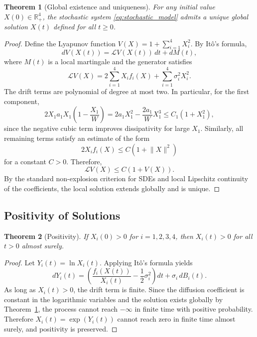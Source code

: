 \documentclass[11pt]{article}
\numberwithin{equation}{section}
\newtheorem{theorem}{Theorem}[section]
\begin{document}
\begin{theorem}[Global existence and uniqueness]\label{thm:G-exist_unique}
For any initial value $X(0)\in\mathbb{R}_+^4$, the stochastic system \eqref{eq:stochastic_model} admits a unique global solution $X(t)$ defined for all $t\ge 0$.
\end{theorem}

\begin{proof}
Define the Lyapunov function $V(X)=1+\sum_{i=1}^4X_i^2$. By It\^o's formula,
\begin{equation}\label{eq:Ito_V}
dV(X(t))=\mathcal{L}V(X(t))\,dt+dM(t),
\end{equation}
where $M(t)$ is a local martingale and the generator satisfies
\begin{equation}\label{eq:gen_V}
\mathcal{L}V(X)=2\sum_{i=1}^4X_if_i(X)+\sum_{i=1}^4\sigma_i^2X_i^2.
\end{equation}
The drift terms are polynomial of degree at most two. In particular, for the first component,
\begin{equation}\label{eq:bound_first_drift}
2X_1a_1X_1\left(1-\frac{X_1}{W}\right)
=2a_1X_1^2-\frac{2a_1}{W}X_1^3
\le C_1(1+X_1^2),
\end{equation}
since the negative cubic term improves dissipativity for large $X_1$. Similarly, all remaining terms satisfy an estimate of the form
\begin{equation}\label{eq:bound_general}
2X_if_i(X)\le C(1+\lVert X\rVert^2)
\end{equation}
for a constant $C>0$. Therefore,
\begin{equation}\label{eq:gen_bound}
\mathcal{L}V(X)\le C(1+V(X)).
\end{equation}
By the standard non-explosion criterion for SDEs and local Lipschitz continuity of the coefficients, the local solution extends globally and is unique.
\end{proof}

\subsection{Positivity of Solutions}

\begin{theorem}[Positivity]\label{thm:positivity}
If $X_i(0)>0$ for $i=1,2,3,4$, then $X_i(t)>0$ for all $t>0$ almost surely.
\end{theorem}

\begin{proof}
Let $Y_i(t)=\ln X_i(t)$. Applying It\^o's formula yields
\begin{equation}\label{eq:Ito_log}
dY_i(t)=\left(\frac{f_i(X(t))}{X_i(t)}-\frac{1}{2}\sigma_i^2\right)dt+\sigma_i\,dB_i(t).
\end{equation}
As long as $X_i(t)>0$, the drift term is finite. Since the diffusion coefficient is constant in the logarithmic variables and the solution exists globally by Theorem~\ref{thm:G-exist_unique}, the process cannot reach $-\infty$ in finite time with positive probability. Therefore $X_i(t)=\exp(Y_i(t))$ cannot reach zero in finite time almost surely, and positivity is preserved.
\end{proof}
\end{document}
